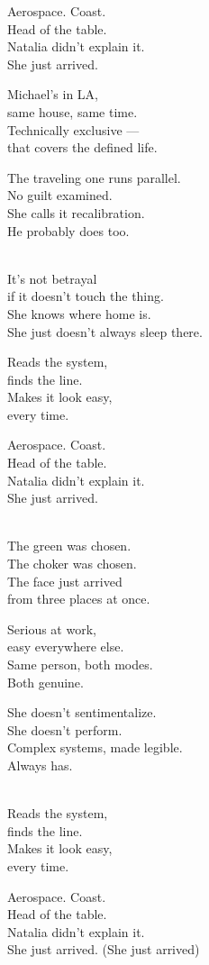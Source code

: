 \begin{lyrics}
Aerospace. Coast.\\
Head of the table.\\
Natalia didn't explain it.\\
She just arrived.

Michael's in LA,\\
same house, same time.\\
Technically exclusive —\\
that covers the defined life.

The traveling one runs parallel.\\
No guilt examined.\\
She calls it recalibration.\\
He probably does too.

\\
It's not betrayal\\
if it doesn't touch the thing.\\
She knows where home is.\\
She just doesn't always sleep there.

Reads the system,\\
finds the line.\\
Makes it look easy,\\
every time.

Aerospace. Coast.\\
Head of the table.\\
Natalia didn't explain it.\\
She just arrived.

\\
The green was chosen.\\
The choker was chosen.\\
The face just arrived\\
from three places at once.

Serious at work,\\
easy everywhere else.\\
Same person, both modes.\\
Both genuine.

She doesn't sentimentalize.\\
She doesn't perform.\\
Complex systems, made legible.\\
Always has.

\\
Reads the system,\\
finds the line.\\
Makes it look easy,\\
every time.

Aerospace. Coast.\\
Head of the table.\\
Natalia didn't explain it.\\
She just arrived. 
(She just arrived)

\end{lyrics}

